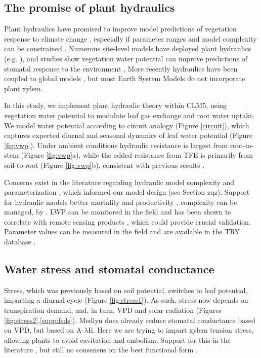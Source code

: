 \documentclass[draft,linenumbers]{agujournal}
\begin{document}
\subsection{The promise of plant hydraulics}
    Plant hydraulics have promised to improve model predictions of vegetation response to climate change \citep{sperry2015}, 
    especially if parameter ranges and model complexity can be constrained \citep{rogers2017}.
    Numerous site-level models have deployed plant hydraulics (e.g. \citet{williams1996,sperry1998,bohrer2005}), and studies show
    vegetation water potential can improve predictions of stomatal response to the environment \citep{sperry2017,anderegg2017},
    More recently hydraulics have been coupled to global models \citep{bonan2014,xu2016,christoffersen2016}, but most Earth System Models do not incorporate plant xylem.

    In this study, we implement plant hydraulic theory within CLM5, 
    using vegetation water potential to modulate leaf gas exchange and root water uptake.
    We model water potential according to circuit analogy (Figure \ref{circuit}), which captures expected diurnal and seasonal dynamics of leaf water potential (Figure \ref{fig:vwp}).
    Under ambient conditions hydraulic resistance is largest from root-to-stem (Figure \ref{fig:vwp}a), 
    while the added resistance from TFE is primarily from soil-to-root (Figure \ref{fig:vwp}b), consistent with previous results \citep{fisher2006}.

    Concerns exist in the literature regarding hydraulic model complexity and parameterization \citep{verhoef2014,drake2017}, 
    which informed our model design (see Section zqz).
    Support for hydraulic models better mortality and productivity \citep{mcdowell2018,choat2012}, complexity can be managed, by  \citep{bartlett2016,powell2018}.
    LWP can be monitored in the field \citep{boyer1967} and has been shown to correlate with remote sensing products \citep{momen2017}, 
    which could provide crucial validation.
    Parameter values can be measured in the field \citep{sack2002} and are available in the TRY database \citep{kattge2011}.

\subsection{Water stress and stomatal conductance}

    Stress, which was previously based on soil potential, switches to leaf potential, imparting a diurnal cycle (Figure \ref{fig:stress1}).
    As such, stress now depends on transpiration demand, and, in turn, VPD and solar radiation (Figures \ref{fig:stress2},\ref{supp:fsds}).
    Medlyn does already reduce stomatal conductance based on VPD, but based on A-$\lambda$E.
    Here we are trying to impart xylem tension stress, allowing plants to avoid cavitation and embolism.
    Support for this in the literature \citep{novick2016a,sperry2017}, but still no consensus on the best functional form \citep{zhou2013}. 
    
\end{document}
